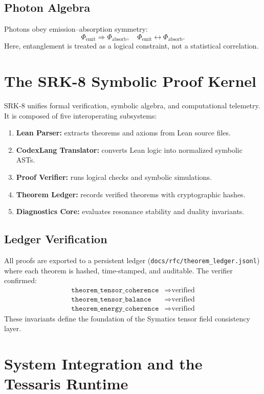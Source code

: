 \documentclass[12pt]{article}
\begin{document}
\subsection{Photon Algebra}
Photons obey emission–absorption symmetry:
\[
\Phi_{\text{emit}} \Rightarrow \Phi_{\text{absorb}}, \quad \Phi_{\text{emit}} \leftrightarrow \Phi_{\text{absorb}}.
\]
Here, entanglement is treated as a logical constraint, not a statistical correlation.

\section{The SRK-8 Symbolic Proof Kernel}

SRK-8 unifies formal verification, symbolic algebra, and computational telemetry.  
It is composed of five interoperating subsystems:

\begin{enumerate}[noitemsep]
    \item \textbf{Lean Parser:} extracts theorems and axioms from Lean source files.
    \item \textbf{CodexLang Translator:} converts Lean logic into normalized symbolic ASTs.
    \item \textbf{Proof Verifier:} runs logical checks and symbolic simulations.
    \item \textbf{Theorem Ledger:} records verified theorems with cryptographic hashes.
    \item \textbf{Diagnostics Core:} evaluates resonance stability and duality invariants.
\end{enumerate}

\subsection{Ledger Verification}
All proofs are exported to a persistent ledger (\texttt{docs/rfc/theorem\_ledger.jsonl}) where each theorem is hashed, time-stamped, and auditable.  
The verifier confirmed:
\begin{align*}
\texttt{theorem\_tensor\_coherence} &\Rightarrow \text{verified}\\
\texttt{theorem\_tensor\_balance} &\Rightarrow \text{verified}\\
\texttt{theorem\_energy\_coherence} &\Rightarrow \text{verified}
\end{align*}
These invariants define the foundation of the Symatics tensor field consistency layer.

\section{System Integration and the Tessaris Runtime}
\end{document}
